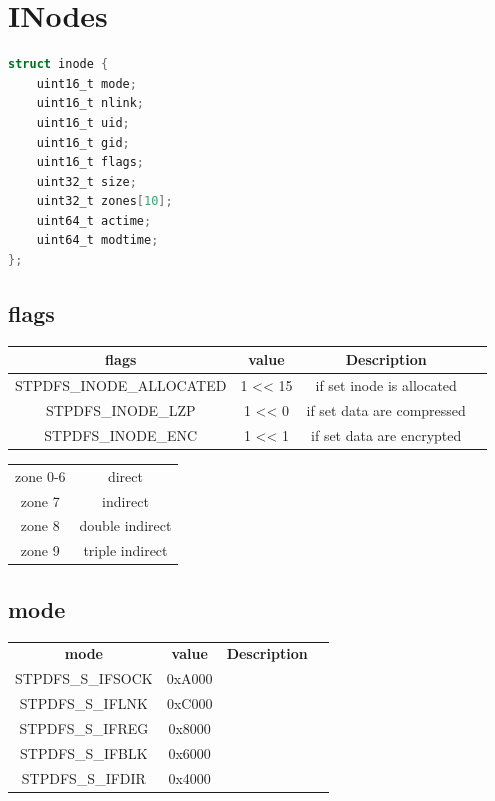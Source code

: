 \documentclass[a4paper, 12pt, openright, english]{scrbook}
\begin{document}
	\section{INodes}

	\begin{lstlisting}[language=C]
struct inode {
	uint16_t mode;
	uint16_t nlink;
	uint16_t uid;
	uint16_t gid;
	uint16_t flags;
	uint32_t size;
	uint32_t zones[10];
	uint64_t actime;
	uint64_t modtime;
};
	\end{lstlisting}
	
	\subsection{flags}

	\begin{center}
		\begin{tabular}{ |c|c|c|c| } 
 			\hline
	 		\textbf{flags} & \textbf{value} & \textbf{Description}  \\ 
			\hline
			STPDFS\_INODE\_ALLOCATED & 1 << 15 & if set inode is allocated \\
			STPDFS\_INODE\_LZP & 1 << 0 & if set data are compressed \\
			STPDFS\_INODE\_ENC &  1 << 1 & if set data are encrypted \\
 		\hline
		\end{tabular}
	\end{center}

	\begin{center}
		\begin{tabular}{ |c|c| }
			zone 0-6 & direct \\
			zone 7 & indirect \\
			zone 8 & double indirect \\
			zone 9 & triple indirect \\
		\end{tabular}
	\end{center}

	\subsection{mode}

	\begin{center}
		\begin{tabular}{ |c|c|c|c| } 
 			\hline
 			\textbf{mode} & \textbf{value} & \textbf{Description}  \\ 
			STPDFS\_S\_IFSOCK & 0xA000 & \\
			STPDFS\_S\_IFLNK  & 0xC000 & \\
			STPDFS\_S\_IFREG & 0x8000 & \\
			STPDFS\_S\_IFBLK  & 0x6000 & \\
			STPDFS\_S\_IFDIR &  0x4000 & \\
 			\hline
		\end{tabular}
	\end{center}
\end{document}
